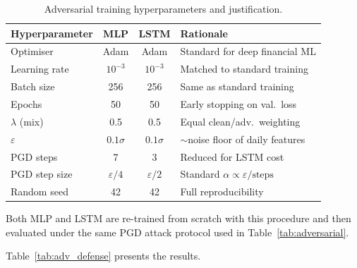 \documentclass[preprint,review,12pt]{elsarticle}
\begin{document}
\begin{table}[H]
\centering
\caption{Adversarial training hyperparameters and justification.}
\label{tab:at_hyperparams}
\footnotesize
\begin{tabular}{@{}lccl@{}}
\toprule
\textbf{Hyperparameter} & \textbf{MLP} & \textbf{LSTM} & \textbf{Rationale} \\
\midrule
Optimiser          & Adam           & Adam           & Standard for deep financial ML \\
Learning rate      & $10^{-3}$      & $10^{-3}$      & Matched to standard training \\
Batch size         & 256            & 256            & Same as standard training \\
Epochs             & 50             & 50             & Early stopping on val.\ loss \\
$\lambda$ (mix)    & 0.5            & 0.5            & Equal clean/adv.\ weighting \\
$\varepsilon$      & $0.1\sigma$    & $0.1\sigma$    & $\sim$noise floor of daily features \\
PGD steps          & 7              & 3              & Reduced for LSTM cost \\
PGD step size      & $\varepsilon/4$& $\varepsilon/2$& Standard $\alpha \propto \varepsilon/\text{steps}$ \\
Random seed        & 42             & 42             & Full reproducibility \\
\bottomrule
\end{tabular}
\end{table}

Both MLP and LSTM are re-trained from scratch with this procedure and then evaluated under the same PGD attack protocol used in Table~\ref{tab:adversarial}.

Table~\ref{tab:adv_defense} presents the results.

\begin{table}[H]
\centering
\caption{Adversarial Training Defense: Standard vs.\ Adversarial-Trained models at $\varepsilon = 0.10\sigma$.
SSR = Signal Stability Rate (fraction of signals retaining their sign under attack).
Higher SSR and lower Sharpe Drop indicate more robust models.
}
\label{tab:adv_defense}
\footnotesize

\end{table}
\end{document}

